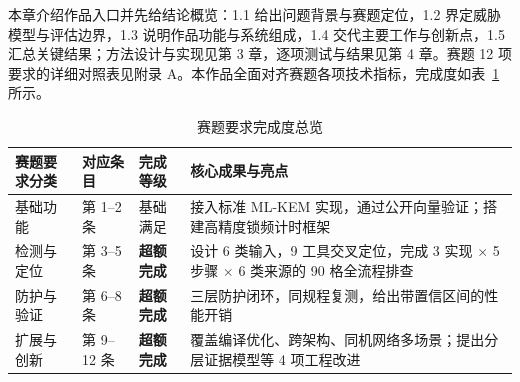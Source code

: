本章介绍作品入口并先给结论概览：1.1 给出问题背景与赛题定位，1.2 界定威胁模型与评估边界，1.3 说明作品功能与系统组成，1.4 交代主要工作与创新点，1.5 汇总关键结果；方法设计与实现见第 3 章，逐项测试与结果见第 4 章。赛题 12 项要求的详细对照表见附录 A。本作品全面对齐赛题各项技术指标，完成度如表~\ref{tab:req_summary} 所示。

\begin{table}[H]
\centering
\caption{赛题要求完成度总览}
\label{tab:req_summary}
{\footnotesize
\renewcommand{\arraystretch}{1.15}
\begin{tabularx}{\textwidth}{|>{\centering\arraybackslash}p{2.2cm}|>{\centering\arraybackslash}p{1.8cm}|>{\centering\arraybackslash}p{1.8cm}|>{\raggedright\arraybackslash}X|}
\hline
\textbf{赛题要求分类} & \textbf{对应条目} & \textbf{完成等级} & \textbf{核心成果与亮点} \\
\hline
基础功能 & 第 1--2 条 & 基础满足 & 接入标准 ML-KEM 实现，通过公开向量验证；搭建高精度锁频计时框架 \\
\hline
检测与定位 & 第 3--5 条 & \textbf{超额完成} & 设计 6 类输入，9 工具交叉定位，完成 3 实现 $\times$ 5 步骤 $\times$ 6 类来源的 90 格全流程排查 \\
\hline
防护与验证 & 第 6--8 条 & \textbf{超额完成} & 三层防护闭环，同规程复测，给出带置信区间的性能开销 \\
\hline
扩展与创新 & 第 9--12 条 & \textbf{超额完成} & 覆盖编译优化、跨架构、同机网络多场景；提出分层证据模型等 4 项工程改进 \\
\hline
\end{tabularx}
\par{}
}
\end{table}

